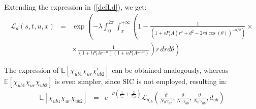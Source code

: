 \documentclass[12pt, letterpaper, onecolumn, draftcls]{IEEEtran}
\begin{document}
Extending the expression in (\ref{defLd}), we get:
\begin{eqnarray}
 \mathscr{L}_d(s,t,u,x) & = & \exp\left(-\lambda\int_0^{2\pi}\int_x^{+\infty}\left(1-\frac{1}{\left(1+sP_tA\left(r^2+d^2-2rd\cos(\theta)\right)^{-\alpha/2}\right)}\times\right.\right. \nonumber\\
 & & \times \left.\left. \frac{1}{\left(1+tP_tAr^{-\alpha}\right)\left(1+uP_tAr^{-\alpha}\right)}\right)r\,drd\theta\right)
 \label{defLd3}
\end{eqnarray}

The expression of $\mathbb{E}\left[\chi_{ub1}\chi_{ur}\chi_{ub2}^i\right]$ can be obtained analogously, whereas $\mathbb{E}\left[\chi_{ub1}\chi_{ur}\chi_{ub2}\right]$ is even simpler, since SIC is not employed, resulting in:
\begin{eqnarray}
 \mathbb{E}\left[\chi_{ub1}\chi_{ur}\chi_{ub2}\right] & = & e^{-\vartheta\left(\frac{1}{\gamma_{ur}}+\frac{2}{\gamma_{ub}}\right)}\mathscr{L}_{d_{rb}}\left(\frac{\vartheta}{N_0\gamma_{ur}},\frac{\vartheta}{N_0\gamma_{ub}},\frac{\vartheta}{N_0\gamma_{ub}},d_{ub}\right)
\end{eqnarray}




\end{document}
